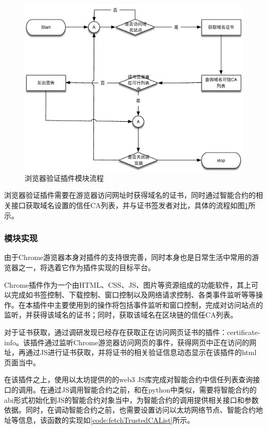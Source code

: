 \begin{figure}[!htbp]
 	\centering
 	\includegraphics[width=1\textwidth]{img/chrome_extension}
 	\caption{浏览器验证插件模块流程}\label{fig:chrome_extension}
\end{figure}

浏览器验证插件需要在游览器访问网址时获得域名的证书，同时通过智能合约的相关接口获取域名设置的信任CA列表，并与证书签发者对比，具体的流程如图\ref{fig:chrome_extension}所示。


\subsubsection{模块实现}


由于Chrome游览器本身对插件的支持很完善，同时本身也是日常生活中常用的游览器之一，将选着它作为插件实现的目标平台。

Chrome插件作为一个由HTML、CSS、JS、图片等资源组成的功能软件，其上可以完成如书签控制、下载控制、窗口控制以及网络请求控制、各类事件监听等等操作。在本插件中主要使用到的操作将包括事件监听和窗口控制，完成对访问站点的监听，并获得该域名的证书；同时，获取该域名在区块链的信任CA列表。

对于证书获取，通过调研发现已经存在获取正在访问网页证书的插件：certificate-info\cite{certificateinfo}。该插件通过监听Chrome游览器访问网页的事件，获得网页中正在访问的网址，再通过JS进行证书获取，并将证书的相关验证信息动态显示在该插件的html页面当中。

在该插件之上，使用以太坊提供的的web3 JS库完成对智能合约中信任列表查询接口的调用。在通过JS调用智能合约之前，和在python中类似，需要将智能合约的abi形式初始化到JS的智能合约对象当中，为智能合约的调用提供相关接口和参数依据。同时，在调动智能合约之前，也需要设置访问以太坊网络节点、智能合约地址等信息，该函数的实现如\ref{code:fetchTrustedCAList}所示。

